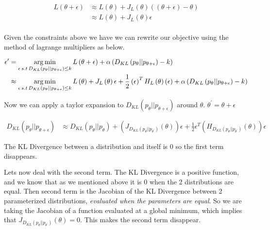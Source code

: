 \documentclass[12pt, a4paper]{report}
\theoremstyle{definition}
\theoremstyle{definition}
\theoremstyle{definition}
\begin{document}
\begin{align*}
L\left(\theta + \epsilon\right) &\approx L\left( \theta \right) + J_L \left( \theta\right) \left( \left( \theta + \epsilon \right) - \theta \right)  \\
&\approx L\left( \theta \right) +  J_L \left( \theta\right) \epsilon \\
\end{align*}

Given the constraints above we have we can rewrite our objective using the method of lagrange multipliers as below.


\begin{align}
    \epsilon^\prime &= \operatorname*{arg\,min}_{\epsilon \, s.t \, D_{KL} \left(p_\theta || p_{\theta + \epsilon} \right) \leq k} L \left( \theta + \epsilon \right) + \alpha \left( D_{KL} \left(p_\theta || p_{\theta + \epsilon} \right) - k\right) \\
    &\approx \operatorname*{arg\,min}_{\epsilon \, s.t \, D_{KL} \left(p_\theta || p_{\theta + \epsilon} \right) \leq k}  L\left( \theta \right) +  J_L \left( \theta\right) \epsilon  + \frac{1}{2} \left(\epsilon \right)^T H_L \left(\theta \right) \left( \epsilon\right) + \alpha \left( D_{KL} \left(p_\theta || p_{\theta + \epsilon} \right) - k\right) \\
\end{align}

Now we can apply a taylor expansion to $D_{KL} \left(p_\theta || p_{\theta + \epsilon} \right)$ around $\theta$. $\theta^\prime = \theta + \epsilon$


\begin{align}
    D_{KL} \left(p_\theta || p_{\theta + \epsilon} \right) &\approx  D_{KL} \left(p_\theta || p_{\theta} \right) + \left(J_{D_{KL} \left(p_\theta || p_{\theta^\prime} \right)}\left( \theta \right) \right) \epsilon + \frac{1}{2} \epsilon^T \left( H_{D_{KL} \left(p_\theta || p_{\theta^\prime} \right)}\left( \theta \right) \right) \epsilon
\end{align}

The KL Divergence between a distribution and itself is $0$ so the first term disappears.


Lets now deal with the second term. The KL Divergence is a positive function, and we know that as we mentioned above it is $0$ when the 2 distributions are equal. Then second term is the Jacobian of the KL Divergence between 2 parameterized distributions, \textit{evaluated when the parameters are equal}. So we are taking the Jacobian of a function evaluated at a global minimum, which implies that $J_{D_{KL} \left(p_\theta || p_{\theta^\prime} \right)}\left( \theta \right)  = 0$. This makes the second term disappear.
\end{document}
